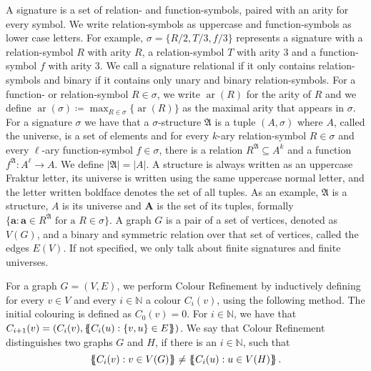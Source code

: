 A signature is a set of relation- and function-symbols, paired with an arity for every symbol.
We write relation-symbols as uppercase and function-symbols as lower case letters.
For example, $\sigma=\{R/2, T/3, f/3\}$ represents a signature with a relation-symbol $R$ with arity $R$, a relation-symbol $T$ with arity $3$ and a function-symbol $f$ with arity $3$.
We call a signature relational if it only contains relation-symbols and binary if it contains only unary and binary relation-symbols.
For a function- or relation-symbol $R\in \sigma$, we write $\operatorname{ar}(R)$ for the arity of $R$ and we define $\operatorname{ar}(\sigma)\coloneqq \max_{R\in\sigma}\{\operatorname{ar}(R)\}$ as the maximal arity that appears in $\sigma$.
For a signature $\sigma$ we have that a $\sigma$-structure $\mathfrak A$ is a tuple $(A,\sigma)$ where $A$, called the universe, is a set of elements and for every $k$-ary relation-symbol $R\in \sigma$ and every $\ell$-ary function-symbol $f\in \sigma$, there is a relation $R^{\mathfrak A}\subseteq A^k$ and a function $f^{\mathfrak A}:A^\ell \to A$.
We define $\vert \mathfrak A\vert =\vert A \vert$.
A structure is always written as an uppercase Fraktur letter, its universe is written using the same uppercase normal letter, and the letter written boldface denotes the set of all tuples.
As an example, $\mathfrak A$ is a structure, $A$ is its universe and $\mathbf A$ is the set of its tuples, formally $\{\mathbf a : \mathbf a \in R^{\mathfrak A} \text{ for a } R\in\sigma\}$.
A graph $G$ is a pair of a set of vertices, denoted as $V(G)$, and a binary and symmetric relation over that set of vertices, called the edges $E(V)$.
If not specified, we only talk about finite signatures and finite universes.

For a graph $G=(V,E)$, we perform Colour Refinement by inductively defining for every $v\in V$ and every $i\in \mathbb N$ a colour $C_i(v)$, using the following method.
The initial colouring is defined as $C_0(v)=0$.
For $i\in \mathbb N$, we have that $C_{i+1}(v)=(C_i(v), \left\{\kern-.35em\left\{C_i(u) : \{v,u\}\in E\right\}\kern-.35em\right\})$.
We say that Colour Refinement distinguishes two graphs $G$ and $H$, if there is an $i\in \mathbb N$, such that 
$$\left\{\kern-.35em\left\{C_i(v) : v\in V(G)\right\}\kern-.35em\right\}\neq \left\{\kern-.35em\left\{C_i(u) : u \in V(H)\right\}\kern-.35em\right\}.$$

